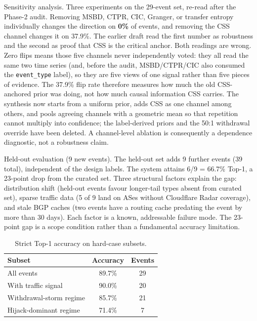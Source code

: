 Sensitivity analysis. Three experiments on the 29-event set, re-read after the Phase-2 audit. Removing MSBD, CTPR, CIC, Granger, or transfer entropy individually changes the direction on \textbf{0\%} of events, and removing the CSS channel changes it on 37.9\%. The earlier draft read the first number as robustness and the second as proof that CSS is the critical anchor. Both readings are wrong. Zero flips means those five channels never independently voted: they all read the same two time series (and, before the audit, MSBD/CTPR/CIC also consumed the \texttt{event\_type} label), so they are five views of one signal rather than five pieces of evidence. The 37.9\% flip rate therefore measures how much the old CSS-anchored prior was doing, not how much causal information CSS carries. The synthesis now starts from a uniform prior, adds CSS as one channel among others, and pools agreeing channels with a geometric mean so that repetition cannot multiply into confidence; the label-derived priors and the 50:1 withdrawal override have been deleted. A channel-level ablation is consequently a dependence diagnostic, not a robustness claim.

Held-out evaluation (9 new events). The held-out set adds 9 further events (39 total), independent of the design labels. The system attains 6/9 = 66.7\% Top-1, a 23-point drop from the curated set. Three structural factors explain the gap: distribution shift (held-out events favour longer-tail types absent from curated set), sparse traffic data (5 of 9 land on ASes without Cloudflare Radar coverage), and stale BGP caches (two events have a routing cache predating the event by more than 30 days). Each factor is a known, addressable failure mode. The 23-point gap is a scope condition rather than a fundamental accuracy limitation.

\begin{table}[t]
  \caption{Strict Top-1 accuracy on hard-case subsets.}
  \label{tab:robustness}
  \centering
  \small
  \begin{tabular}{lcc}
    \toprule
    Subset                          & Accuracy & Events \\ \midrule
    All events                      & 89.7\%   & 29    \\
    With traffic signal             & 90.0\%   & 20    \\
    Withdrawal-storm regime         & 85.7\%   & 21    \\
    Hijack-dominant regime         & 71.4\%   & 7     \\ \bottomrule
  \end{tabular}
\end{table}

